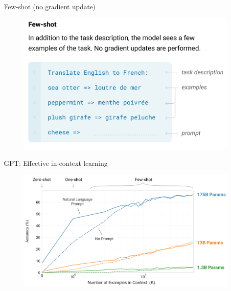 \begin{vbframe}{Few-shot (no gradient update)}

\vfill

	\begin{figure}
		\centering
		\includegraphics[width=11cm]{figure/gptfewshot.png}
	\end{figure}

\vfill

\end{vbframe}


\begin{vbframe}{GPT: Effective in-context learning}
	
	\vfill
	
	\begin{figure}
		\centering
		\includegraphics[width=11cm]{figure/incontextlearning.png}
	\end{figure}
	\vfill
	
\end{vbframe}



